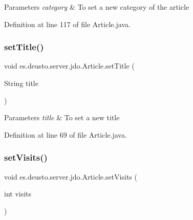 \begin{DoxyParams}{Parameters}
{\em category} & To set a new category of the article \\
\hline
\end{DoxyParams}


Definition at line 117 of file Article.\+java.

\mbox{\label{classes_1_1deusto_1_1server_1_1jdo_1_1_article_a9ce648f3e251a70a23f095049cd42e63}} 
\subsubsection{\texorpdfstring{set\+Title()}{setTitle()}}
{\footnotesize\ttfamily void es.\+deusto.\+server.\+jdo.\+Article.\+set\+Title (\begin{DoxyParamCaption}\item[{String}]{title }\end{DoxyParamCaption})}


\begin{DoxyParams}{Parameters}
{\em title} & To set a new title \\
\hline
\end{DoxyParams}


Definition at line 69 of file Article.\+java.

\mbox{\label{classes_1_1deusto_1_1server_1_1jdo_1_1_article_a0804eae1dafaa95ab89d2f481535ebf2}} 
\subsubsection{\texorpdfstring{set\+Visits()}{setVisits()}}
{\footnotesize\ttfamily void es.\+deusto.\+server.\+jdo.\+Article.\+set\+Visits (\begin{DoxyParamCaption}\item[{int}]{visits }\end{DoxyParamCaption})}



